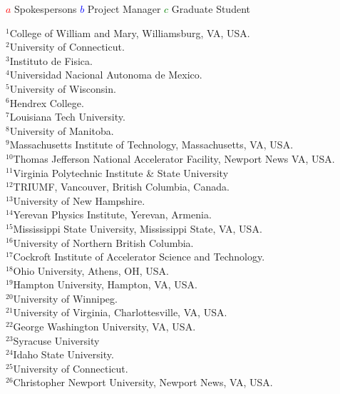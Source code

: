 \begin{singlespace}
\vspace{0.5cm}

\begin{center}
\textcolor{red}{$a$} Spokespersons \hspace{1cm} \textcolor{blue}{$b$} Project Manager \hspace{1cm} \textcolor{green}{$c$} Graduate Student
\end{center}

\vspace{0.5cm}

\begin{center}
$^1$College of William and Mary, Williamsburg, VA, USA.\\
$^2$University of Connecticut.\\
$^3$Instituto de Fisica.\\
$^4$Universidad Nacional Autonoma de Mexico.\\
$^5$University of Wisconsin.\\
$^6$Hendrex College.\\
$^7$Louisiana Tech University.\\
$^8$University of Manitoba.\\
$^9$Massachusetts Institute of Technology, Massachusetts, VA, USA.\\
$^{10}$Thomas Jefferson National Accelerator Facility, Newport News VA, USA.\\
$^{11}$Virginia Polytechnic Institute \& State University\\
$^{12}$TRIUMF, Vancouver, British Columbia, Canada.\\
$^{13}$University of New Hampshire.\\
$^{14}$Yerevan Physics Institute, Yerevan, Armenia.\\
$^{15}$Mississippi State University, Mississippi State, VA, USA.\\
$^{16}$University of Northern British Columbia.\\
$^{17}$Cockroft Institute of Accelerator Science and Technology.\\
$^{18}$Ohio University, Athens, OH, USA.\\
$^{19}$Hampton University, Hampton, VA, USA.\\
$^{20}$University of Winnipeg.\\
$^{21}$University of Virginia, Charlottesville, VA, USA.\\
$^{22}$George Washington University, VA, USA.\\
$^{23}$Syracuse University\\
$^{24}$Idaho State University.\\
$^{25}$University of Connecticut.\\ 
$^{26}$Christopher Newport University, Newport News, VA, USA.
\end{center}
\end{singlespace}

